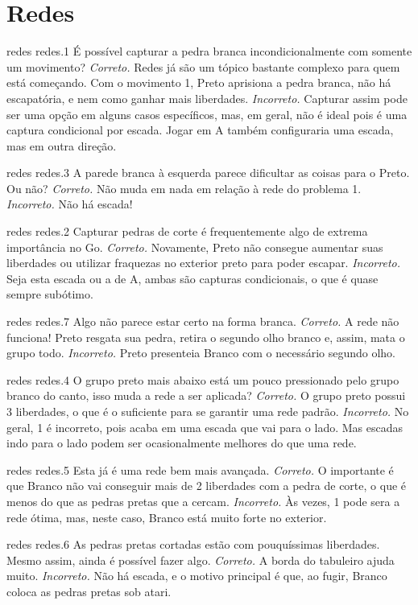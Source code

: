\chapter{Redes}

\emptypage

\problemAnswerDiagram
  {redes}
  {redes.1}
  {É possível capturar a pedra branca incondicionalmente com somente um movimento?}
  {\emph{Correto.} Redes já são um tópico bastante complexo para quem está começando. Com o movimento 1, Preto aprisiona a pedra branca, não há escapatória, e nem como ganhar mais liberdades.}
  {\emph{Incorreto.} Capturar assim pode ser uma opção em alguns casos específicos, mas, em geral, não é ideal pois é uma captura condicional por escada. Jogar em A também configuraria uma escada, mas em outra direção.}

\problemAnswerDiagram
  {redes}
  {redes.3}
  {A parede branca à esquerda parece dificultar as coisas para o Preto. Ou não?}
  {\emph{Correto.} Não muda em nada em relação à rede do problema 1.}
  {\emph{Incorreto.} Não há escada!}

\problemAnswerDiagram
  {redes}
  {redes.2}
  {Capturar pedras de corte é frequentemente algo de extrema importância no Go.}
  {\emph{Correto.} Novamente, Preto não consegue aumentar suas liberdades ou utilizar fraquezas no exterior preto para poder escapar.}
  {\emph{Incorreto.} Seja esta escada ou a de A, ambas são capturas condicionais, o que é quase sempre subótimo.}

\problemAnswerDiagram
  {redes}
  {redes.7}
  {Algo não parece estar certo na forma branca.}
  {\emph{Correto.} A rede não funciona! Preto resgata sua pedra, retira o segundo olho branco e, assim, mata o grupo todo.}
  {\emph{Incorreto.} Preto presenteia Branco com o necessário segundo olho.}

\problemAnswerDiagram
  {redes}
  {redes.4}
  {O grupo preto mais abaixo está um pouco pressionado pelo grupo branco do canto, isso muda a rede a ser aplicada?}
  {\emph{Correto.} O grupo preto possui 3 liberdades, o que é o suficiente para se garantir uma rede padrão.}
  {\emph{Incorreto.} No geral, 1 é incorreto, pois acaba em uma escada que vai para o lado. Mas escadas indo para o lado podem ser ocasionalmente melhores do que uma rede.}

\problemAnswerDiagram
  {redes}
  {redes.5}
  {Esta já é uma rede bem mais avançada.}
  {\emph{Correto.} O importante é que Branco não vai conseguir mais de 2 liberdades com a pedra de corte, o que é menos do que as pedras pretas que a cercam.}
  {\emph{Incorreto.} Às vezes, 1 pode sera a rede ótima, mas, neste caso, Branco está muito forte no exterior.}

\problemAnswerDiagram
  {redes}
  {redes.6}
  {As pedras pretas cortadas estão com pouquíssimas liberdades. Mesmo assim, ainda é possível fazer algo.}
  {\emph{Correto.} A borda do tabuleiro ajuda muito.}
  {\emph{Incorreto.} Não há escada, e o motivo principal é que, ao fugir, Branco coloca as pedras pretas sob atari.}
